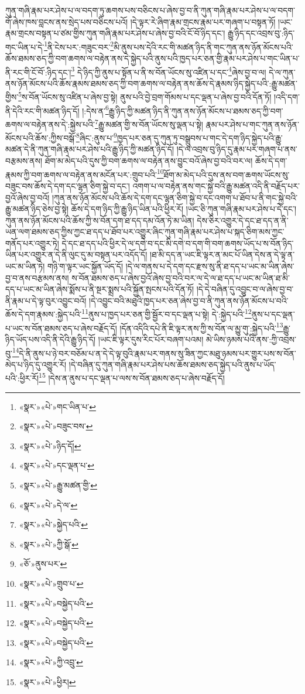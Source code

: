 ཀུན་གཞི་རྣམ་པར་ཤེས་པ་ལ་བདག་ཏུ་ཆགས་པས་བཅིངས་པ་ཞེས་བྱ་བ་ནི་ཀུན་གཞི་རྣམ་པར་ཤེས་པ་ལ་བདག་གོ་ཞེས་ཁས་བླངས་ནས་སྲེད་པས་བཅིངས་པའོ། །དེ་ལྟར་རེ་ཞིག་རྣམ་གྲངས་རྣམ་པར་གཞག་པ་བསྟན་ཏོ། །ཡང་རྣམ་གྲངས་བསྟན་པ་ཙམ་གྱིས་ཀུན་གཞི་རྣམ་པར་ཤེས་པ་ཞེས་བྱ་བའི་ངོ་བོ་ཉིད་དང་། རྒྱུ་ཉིད་དང་འབྲས་བུ་:ཉིད་གང་ཡིན་པ་དེ་\footnote{«སྣར་»«པེ་»གང་ཡིན་པ་}ནི་ངེས་པར་:གཟུང་བར་\footnote{«སྣར་»«པེ་»བཟུང་བས་}མི་ནུས་པས་དེའི་རང་གི་མཚན་ཉིད་ནི་གང་ཀུན་ནས་ཉོན་མོངས་པའི་ཆོས་ཐམས་ཅད་ཀྱི་བག་ཆགས་ལ་བརྟེན་ནས་དེ་སྐྱེད་པའི་ནུས་པའི་ཁྱད་པར་ཅན་གྱི་རྣམ་པར་ཤེས་པ་གང་ཡིན་པ་ནི་རང་གི་ངོ་བོ་:ཉིད་དང་།\footnote{«སྣར་»«པེ་»ཉིད་དོ།} དེ་ཉིད་ཀྱི་ནུས་པ་སྟོན་པ་ནི་ས་བོན་ཡོངས་སུ་འཛིན་པ་དང་\footnote{«སྣར་»«པེ་»དང་ལྡན་པ་}ཞེས་བྱ་བ་ལ། དེ་ལ་ཀུན་ནས་ཉོན་མོངས་པའི་ཆོས་རྣམས་ཐམས་ཅད་ཀྱི་བག་ཆགས་ལ་བརྟེན་ནས་ཆོས་དེ་རྣམས་ཉིད་སྐྱེད་པའི་:རྒྱུ་མཚན་གྱིས་\footnote{«སྣར་»«པེ་»རྒྱུ་མཚན་གྱི་}ས་བོན་ཡོངས་སུ་འཛིན་པ་ཞེས་བྱ་སྟེ། ནུས་པའི་བྱེ་བྲག་གོམས་པ་དང་ལྡན་པ་ཞེས་བྱ་བའི་དོན་ཏོ། །འདི་དག་ནི་དེའི་རང་གི་མཚན་ཉིད་དོ། །:དེས་ན་\footnote{«སྣར་»«པེ་»དེ་ལ་}རྒྱུ་ཉིད་ཀྱི་མཚན་ཉིད་ནི་ཀུན་ནས་ཉོན་མོངས་པ་ཐམས་ཅད་ཀྱི་བག་ཆགས་ལ་བརྟེན་ནས་དེ་:སྐྱེས་པའི་\footnote{«སྣར་»«པེ་»སྐྱེད་པའི་}རྒྱུ་མཚན་གྱི་ས་བོན་ཡོངས་སུ་ལྡན་པ་སྟེ། རྣམ་པར་ཤེས་པ་གང་ཀུན་ནས་ཉོན་མོངས་པའི་ཆོས་:ཀྱིས་བསྒོ་\footnote{«སྣར་»«པེ་»ཀྱི་སྒོ་}ཞིང་:ནུས་པ་\footnote{«ཅོ་»ནུས་པར་}ཁྱད་པར་ཅན་དུ་ཀུན་ཏུ་བསྒྲུབས་པ་གང་དེ་དག་ཉིད་སྐྱེད་པའི་རྒྱུ་མཚན་དེ་ནི་ཀུན་གཞི་རྣམ་པར་ཤེས་པའི་རྒྱུ་ཉིད་ཀྱི་མཚན་ཉིད་དོ། །དེ་ལ་འབྲས་བུ་ཉིད་དུ་རྣམ་པར་གཞག་པ་ནས་བརྩམས་ནས། ཐོག་མ་མེད་པའི་དུས་ཀྱི་བག་ཆགས་ལ་བརྟེན་ནས་བྱུང་བའོ་ཞེས་བྱ་བའི་བར་ལ། ཆོས་དེ་དག་རྣམས་ཀྱི་བག་ཆགས་ལ་བརྟེན་ནས་མངོན་པར་:གྲུབ་པའི་\footnote{«སྣར་»«པེ་»གྲུབ་པ་}ཐོག་མ་མེད་པའི་དུས་ནས་བག་ཆགས་ཡོངས་སུ་བཟུང་བས་ཆོས་དེ་དག་དང་ལྷན་ཅིག་སྐྱེ་བ་དང་། འགག་པ་ལ་བརྟེན་ནས་གང་སྐྱེ་བའི་རྒྱུ་མཚན་འདི་ནི་བརྗོད་པར་བྱའོ་ཞེས་བྱ་བའོ། །ཀུན་ནས་ཉོན་མོངས་པའི་ཆོས་དེ་དག་དང་ལྷན་ཅིག་སྐྱེ་བ་དང་འགག་པ་ཐོབ་པ་ནི་གང་སྐྱེ་བའི་རྒྱུ་མཚན་ཉིད་ཅེས་བྱ་སྟེ། ཆོས་དེ་དག་ཉིད་ཀྱི་རྒྱུ་ཉིད་ཡིན་པའི་ཕྱིར་རོ། །ཡང་ཅི་ཀུན་གཞི་རྣམ་པར་ཤེས་པ་དེ་དང་། ཀུན་ནས་ཉོན་མོངས་པའི་ཆོས་ཀྱི་ས་བོན་དག་ཐ་དད་དམ་འོན་ཏེ་མ་ཡིན། དེས་ཅིར་འགྱུར་དེ་དང་ཐ་དད་ན་ནི་ཡན་ལག་ཐམས་ཅད་ཀྱིས་ཀྱང་ཐ་དད་པ་ཐོབ་པར་འགྱུར་ཞིང་ཀུན་གཞི་རྣམ་པར་ཤེས་པ་སྐད་ཅིག་མས་ཀྱང་གནོད་པར་འགྱུར་ཏེ། དེ་དང་ཐ་དད་པའི་ཕྱིར་དེ་ལ་དགེ་བ་དང་མི་དགེ་བ་དག་གི་བག་ཆགས་ཡོད་པ་ས་བོན་ཉིད་ཡིན་པར་འགྱུར་ན་དེ་ནི་ལུང་དུ་མ་བསྟན་པར་འདོད་དོ། །ཐ་མི་དད་ན་ཡང་ཇི་ལྟར་ན་མང་པོ་ཡིན་དེས་ན་དེ་ལྟ་ན་ཡང་མ་ཡིན་ཏེ། གཉི་ག་ལྟར་ཡང་སྐྱོན་ཡོད་དོ། །དེ་ལ་གནས་པ་དེ་དག་དང་རྫས་སུ་ནི་ཐ་དད་པ་ཡང་མ་ཡིན་ཞེས་བྱ་བ་ནས་བརྩམས་ནས། ས་བོན་ཐམས་ཅད་པ་ཞེས་བྱའོ་ཞེས་བྱ་བའི་བར་ལ་དེ་ལ་ཐ་དད་པ་ཡང་མ་ཡིན་ཐ་མི་དད་པ་ཡང་མ་ཡིན་ཞེས་སྨོས་པ་ནི་སྔར་སྨྲས་པའི་སྐྱོན་སྤངས་པའི་དོན་ཏོ། །དེ་དེ་བཞིན་དུ་འབྱུང་བ་ལ་ཞེས་བྱ་བ་ནི་རྣམ་པ་དེ་ལྟ་བུར་འབྱུང་བའོ། །དེ་འབྱུང་བའི་མཐུའི་ཁྱད་པར་ཅན་ཞེས་བྱ་བ་ནི་ཀུན་ནས་ཉོན་མོངས་པ་བའི་ཆོས་དེ་དག་རྣམས་:སྐྱེད་པའི་\footnote{«སྣར་»«པེ་»བསྐྱེད་པའི་}ནུས་པ་ཁྱད་པར་ཅན་གྱི་སྦྱོར་བ་དང་ལྡན་པ་སྟེ། དེ་:སྐྱེད་པའི་\footnote{«སྣར་»«པེ་»བསྐྱེད་པའི་}ནུས་པ་དང་ལྡན་པ་ཡང་ས་བོན་ཐམས་ཅད་པ་ཞེས་བརྗོད་དོ། །དོན་འདིའི་དཔེ་ནི་ཇི་ལྟར་ནས་ཀྱི་ས་བོན་ལ་མྱུ་གུ་:སྐྱེད་པའི་\footnote{«སྣར་»«པེ་»བསྐྱེད་པའི་}རྒྱུ་ཉིད་ཡོད་པས་འདི་ནི་དེའི་རྒྱུ་ཉིད་དོ། །ཡང་ཇི་ལྟར་དུས་རིང་པོར་བཞག་པའམ། མེ་ཡིས་ཉམས་པའི་ནས་:ཀྱི་འབྲས་བུ་\footnote{«སྣར་»«པེ་»ཀྱི་འབྲུ་}དེ་ནི་ནུས་པ་ཉེ་བར་བཅོམ་པ་ན་དེ་དེ་ལྟ་བུའི་རྣམ་པར་གནས་སུ་ཟིན་ཀྱང་མཐུ་ཉམས་པར་གྱུར་པས་ས་བོན་མེད་པ་ཉིད་དུ་འགྱུར་རོ། །དེ་བཞིན་དུ་ཀུན་གཞི་རྣམ་པར་ཤེས་པས་ཆོས་ཐམས་ཅད་སྐྱེད་པའི་ནུས་པ་ཡོད་པའི་:ཕྱིར་རོ།\footnote{«སྣར་»«པེ་»ཕྱིར།} །དེས་ན་ནུས་པ་དང་ལྡན་པ་ལས་ས་བོན་ཐམས་ཅད་པ་ཞེས་བརྗོད་དོ། 